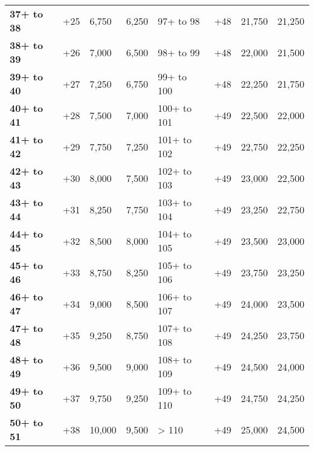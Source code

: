\begin {table}[H]
\begin{tabularx}{\columnwidth}{>{\bfseries}YYYYYYYY}
	37+ to 38 & +25 & 6,750 & 6,250 & 97+ to 98 & +48 & 21,750 & 21,250\\
	38+ to 39 & +26 & 7,000 & 6,500 & 98+ to 99 & +48 & 22,000 & 21,500\\
	39+ to 40 & +27 & 7,250 & 6,750 & 99+ to 100 & +48 & 22,250 & 21,750\\
	40+ to 41 & +28 & 7,500 & 7,000 & 100+ to 101 & +49 & 22,500 & 22,000\\
	41+ to 42 & +29 & 7,750 & 7,250 & 101+ to 102 & +49 & 22,750 & 22,250\\
	42+ to 43 & +30 & 8,000 & 7,500 & 102+ to 103 & +49 & 23,000 & 22,500\\
	43+ to 44 & +31 & 8,250 & 7,750 & 103+ to 104 & +49 & 23,250 & 22,750\\
	44+ to 45 & +32 & 8,500 & 8,000 & 104+ to 105 & +49 & 23,500 & 23,000\\
	45+ to 46 & +33 & 8,750 & 8,250 & 105+ to 106 & +49 & 23,750 & 23,250\\
	46+ to 47 & +34 & 9,000 & 8,500 & 106+ to 107 & +49 & 24,000 & 23,500\\
	47+ to 48 & +35 & 9,250 & 8,750 & 107+ to 108 & +49 & 24,250 & 23,750\\
	48+ to 49 & +36 & 9,500 & 9,000 & 108+ to 109 & +49 & 24,500 & 24,000\\
	49+ to 50 & +37 & 9,750 & 9,250 & 109+ to 110 & +49 & 24,750 & 24,250\\
	50+ to 51 & +38 & 10,000 & 9,500 & > 110 & +49 & 25,000 & 24,500
  \end {tabularx}
\end {table}
